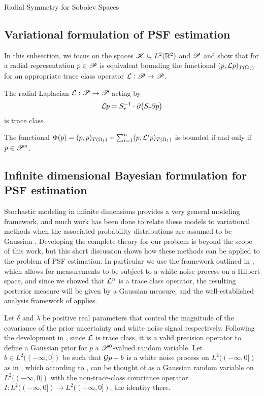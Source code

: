 \begin{chapter}{Radial Symmetry for Sobolev Spaces}
\begin{com}
\subsection{Variational formulation of PSF estimation}
In this subsection, we focus on the spaces $\mathscr K\subseteq L^2(\mathbb R^2)$ and $\mathscr P$ and show that for a radial representation $p \in \mathscr P$ is equivalent bounding the functional $(p,\mathcal L p)_{T(\Omega_1)}$ for an appropriate trace class operator $\mathcal L:\mathscr P \to \mathscr P$.

\begin{claim}
  The radial Laplacian $\mathcal L:\mathscr P \to \mathscr P$ acting by
  \begin{equation}
    \mathcal L p = S_{r}^{-1} \cdot \partial \big( S_r  \partial p\big)
  \end{equation}
  is trace class.
\end{claim}

\begin{claim}
  The functional $\Phi(p) = (p,p)_{T(\Omega_1)} + \sum_{i=1}^n(p,\mathcal L^i p)_{T(\Omega_1)}$ is bounded if and only if $p \in \mathscr P^n$.
\end{claim}

\subsection{Infinite dimensional Bayesian formulation for PSF estimation} \label{sec:infiniteBayesian}

Stochastic modeling in infinite dimensions provides a very general modeling framework, and much work has been done to relate these models to variational methods when the associated probability distributions are assumed to be Gaussian \citep{stuart2010,agapiou2013aspects,lehtinen1989linear,pytev86,vogel84stochastic}.
Developing the complete theory for our problem is beyond the scope of this work, but this short discussion shows how these methods can be applied to the problem of PSF estimation.
In particular we use the framework outlined in \citep{agapiou2013aspects,lehtinen1989linear}, which allows for measurements to be subject to a white noise process on a Hilbert space, and since we showed that $\mathcal L^n$ is a trace class operator, the resulting posterior measure will be given by a Gaussian measure, and the well-established analysis framework of \citep{stuart2010,agapiou2013aspects} applies.

Let $\delta$ and $\lambda$ be positive real parameters that control the magnitude of the covariance of the prior uncertainty and white noise signal respectively.
Following the development in \citep{daprato2006}, since $\mathcal L$ is trace class, it is a valid precision operator to define a Gaussian prior for $p$ a $\mathscr P^0$-valued random variable. 
Let $b \in L^2( (-\infty,0] )$ be such that $\mathcal G p - b$ is a white noise process on $L^2( (-\infty, 0] )$ as in \citep{lehtinen1989linear}, which according to \citep{agapiou2013aspects}, can be thought of as a Gaussian random variable on $L^2( (-\infty,0] )$ with the non-trace-class covariance operator $I:L^2( (-\infty,0] )\to L^2( (-\infty,0] )$, the identity there.


\end{com}
\end{chapter}
